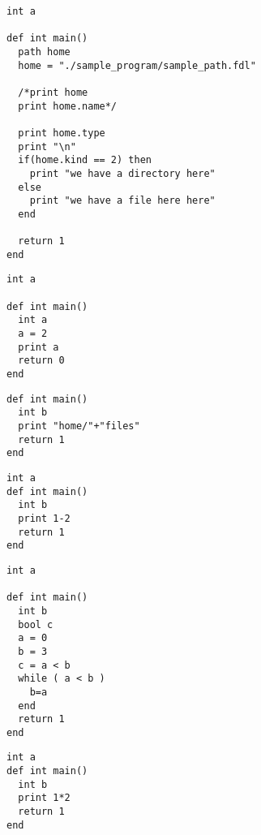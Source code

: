 \documentclass[11pt]{article}
\begin{document}
\begin{listing}[H]
  \begin{verbatim}
int a

def int main()
  path home
  home = "./sample_program/sample_path.fdl"

  /*print home
  print home.name*/

  print home.type
  print "\n"
  if(home.kind == 2) then
    print "we have a directory here"
  else
    print "we have a file here here"
  end

  return 1
end
  \end{verbatim}
\end{listing}

\begin{listing}[H]
  \begin{verbatim}
int a

def int main()
  int a
  a = 2
  print a
  return 0
end
  \end{verbatim}
\end{listing}

\begin{listing}[H]
  \begin{verbatim}
def int main()
  int b
  print "home/"+"files"
  return 1
end
  \end{verbatim}
\end{listing}

\begin{listing}[H]
  \begin{verbatim}
int a
def int main()
  int b
  print 1-2
  return 1
end
  \end{verbatim}
\end{listing}

\begin{listing}[H]
  \begin{verbatim}
int a

def int main()
  int b
  bool c
  a = 0
  b = 3
  c = a < b
  while ( a < b )
    b=a
  end
  return 1
end

  \end{verbatim}
\end{listing}

\begin{listing}[H]
  \begin{verbatim}
int a
def int main()
  int b
  print 1*2
  return 1
end
  \end{verbatim}
\end{listing}
\end{document}
